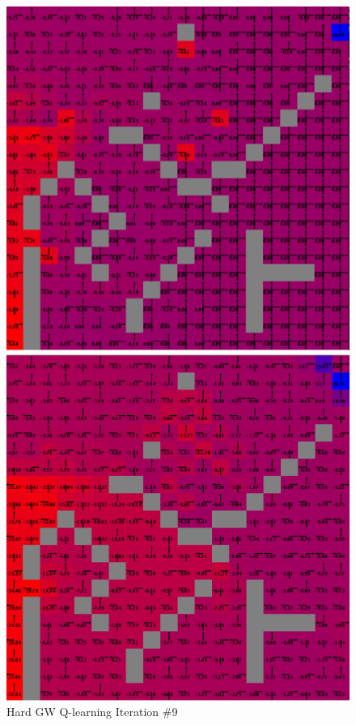 \documentclass[h]{article}
\begin{document}
   \begin{figure}[H]
      \includegraphics[width=1\textwidth,keepaspectratio]{hard-q-9.png} 
      \caption*{Hard GW Q-learning Iteration \#9} 
   \endminipage\hfill
      \includegraphics[width=1\textwidth,keepaspectratio]{hard-q-100.png} 

\end{figure}
\end{document}
